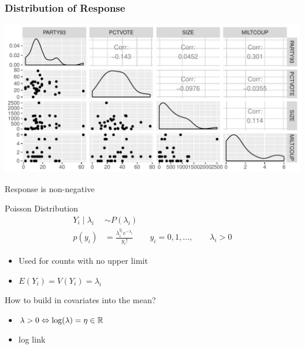 \documentclass[handout]{beamer}\usepackage[]{graphicx}\usepackage[]{color}
\makeatletter
\def\maxwidth{ %
  \ifdim\Gin@nat@width>\linewidth
    \linewidth
  \else
    \Gin@nat@width
  \fi
}
\newenvironment{knitrout}{}{} %
\makeatother
\begin{document}
\begin{frame}[fragile]\frametitle{Distribution of Response}




\begin{knitrout}
\color{fgcolor}
\includegraphics[width=\maxwidth]{figure/pairs-1} 

\end{knitrout}

Response is non-negative
\end{frame}


\begin{frame}{Poisson Distribution}
  \begin{align*}
 Y_i \mid \lambda_i & \sim P(\lambda_i)     \\
p(y_i) & = \frac{\lambda_i^{y_i} e^{-\lambda_i}}{y_i !} \qquad y_i = 0, 1, \ldots,
\qquad \lambda_i > 0
  \end{align*}  \pause

  \begin{itemize}
  \item Used for counts with no upper limit   \pause
  \item $E(Y_i) = V(Y_i) = \lambda_i$  \pause
  \end{itemize}

How to build in covariates into the mean?  \pause
\begin{itemize}
\item $\lambda > 0  \Leftrightarrow \log(\lambda) = \eta \in \mathbb{R}$
\item log link
\end{itemize}
\end{frame}
\end{document}
